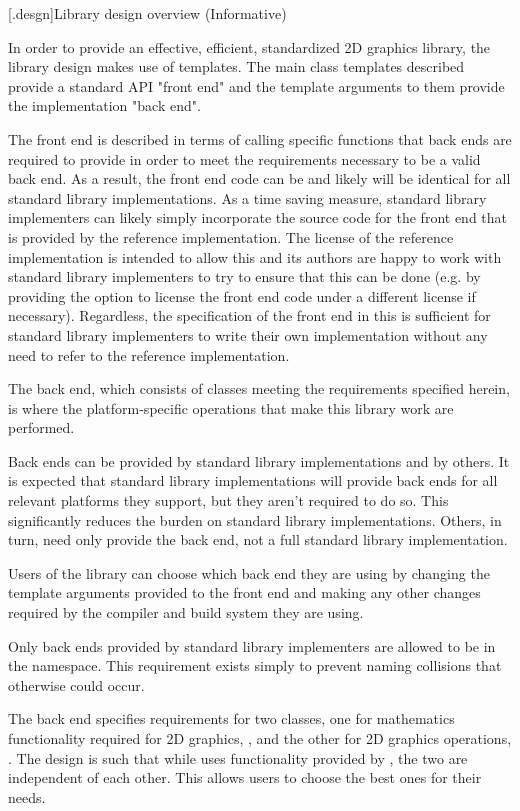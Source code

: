 [\iotwod.desgn]{Library design overview (Informative)}

\pnum
In order to provide an effective, efficient, standardized 2D graphics library, the library design makes use of templates. The main class templates described provide a standard API "front end" and the template arguments to them provide the implementation "back end".

\pnum
The front end is described in terms of calling specific functions that back ends are required to provide in order to meet the requirements necessary to be a valid back end. As a result, the front end code can be and likely will be identical for all standard library implementations. As a time saving measure, standard library implementers can likely simply incorporate the source code for the front end that is provided by the reference implementation. The license of the reference implementation is intended to allow this and its authors are happy to work with standard library implementers to try to ensure that this can be done (e.g. by providing the option to license the front end code under a different license if necessary). Regardless, the specification of the front end in this \documenttypename{} is sufficient for standard library implementers to write their own implementation without any need to refer to the reference implementation.

\pnum
The back end, which consists of classes meeting the requirements specified herein, is where the platform-specific operations that make this library work are performed.

\pnum
Back ends can be provided by standard library implementations and by others. It is expected that standard library implementations will provide back ends for all relevant platforms they support, but they aren't required to do so. This significantly reduces the burden on standard library implementations. Others, in turn, need only provide the back end, not a full standard library implementation.

\pnum
Users of the library can choose which back end they are using by changing the template arguments provided to the front end and making any other changes required by the compiler and build system they are using.

\pnum
Only back ends provided by standard library implementers are allowed to be in the  namespace. This requirement exists simply to prevent naming collisions that otherwise could occur.

\pnum
The back end specifies requirements for two classes, one for mathematics functionality required for 2D graphics, \graphicsmathtemplparamnospace{}, and the other for 2D graphics operations, \graphicssurfacestemplparamnospace{}. The design is such that while \graphicssurfacestemplparamnospace{} uses functionality provided by \graphicsmathtemplparamnospace{}, the two are independent of each other. This allows users to choose the best ones for their needs.

